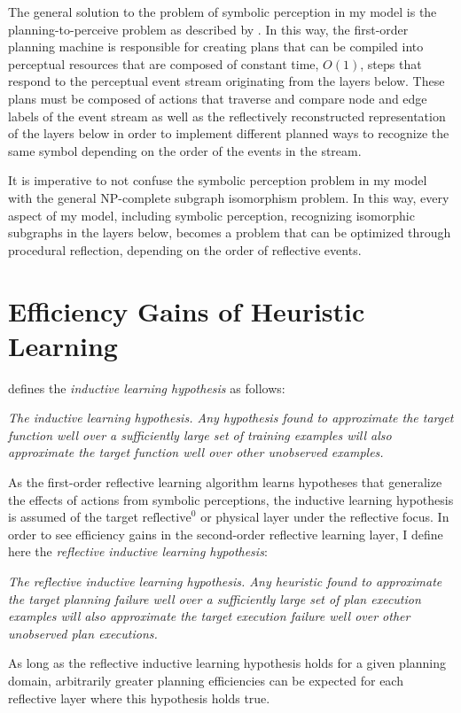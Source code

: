 The general solution to the problem of symbolic perception in my model
is the planning-to-perceive problem as described by
\cite{pryorcollins:1995}.  In this way, the first-order planning
machine is responsible for creating plans that can be compiled into
perceptual resources that are composed of constant time, $O(1)$, steps
that respond to the perceptual event stream originating from the
layers below.  These plans must be composed of actions that traverse
and compare node and edge labels of the event stream as well as the
reflectively reconstructed representation of the layers below in order
to implement different planned ways to recognize the same symbol
depending on the order of the events in the stream.

It is imperative to not confuse the symbolic perception problem in my
model with the general NP-complete subgraph isomorphism problem.  In
this way, every aspect of my model, including symbolic perception,
recognizing isomorphic subgraphs in the layers below, becomes a
problem that can be optimized through procedural reflection, depending
on the order of reflective events.

\section{Efficiency Gains of Heuristic Learning}

\cite{mitchell:1997} defines the \emph{inductive learning hypothesis}
as follows:
\begin{definition}\emph{
\emph{The inductive learning hypothesis.} Any hypothesis found to
approximate the target function well over a sufficiently large set of
training examples will also approximate the target function well over
other unobserved examples.  }\end{definition} As the first-order
reflective learning algorithm learns hypotheses that generalize the
effects of actions from symbolic perceptions, the inductive learning
hypothesis is assumed of the target $\text{reflective}^0$ or physical
layer under the reflective focus.  In order to see efficiency gains in
the second-order reflective learning layer, I define here the
\emph{reflective inductive learning hypothesis}:
\begin{definition}\emph{
\emph{The reflective inductive learning hypothesis.} Any heuristic
found to approximate the target planning failure well over a
sufficiently large set of plan execution examples will also
approximate the target execution failure well over other unobserved
plan executions.}\end{definition} As long as the reflective inductive
learning hypothesis holds for a given planning domain, arbitrarily
greater planning efficiencies can be expected for each reflective
layer where this hypothesis holds true.

